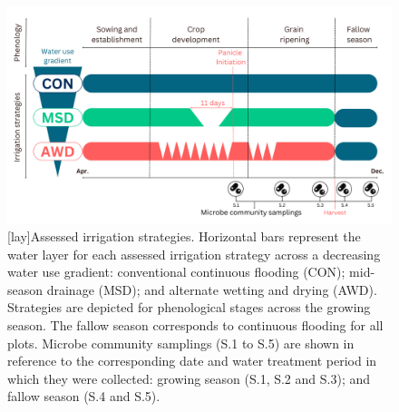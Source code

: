 \begin{figure} [ht]
\captionsetup{justification=justified}
	\centering 
	\includegraphics[scale=0.3, center]{Figures/Chapter_2/CERESTRES_Layout_2023_GSFS.pdf}
	[lay]{Assessed irrigation strategies. Horizontal bars represent the water layer for each assessed irrigation strategy across a decreasing water use gradient: conventional continuous flooding (CON); mid-season drainage (MSD); and alternate wetting and drying (AWD). Strategies are depicted for phenological stages across the growing season. The fallow season corresponds to continuous flooding for all plots. Microbe community samplings (S.1 to S.5) are shown in reference to the corresponding date and water treatment period in which they were collected: growing season (S.1, S.2 and S.3); and fallow season (S.4 and S.5).}
	\label{treat}
\end{figure}

